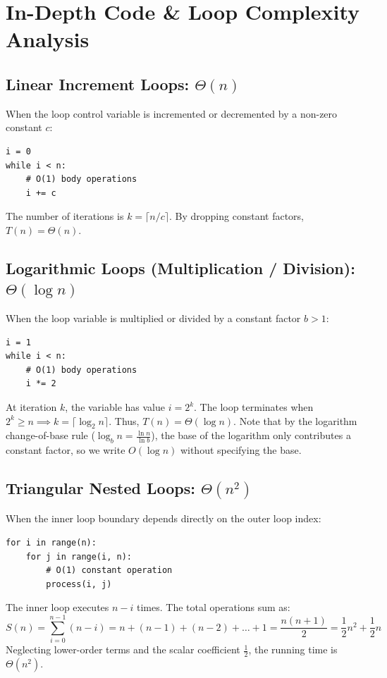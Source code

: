 \documentclass[11pt,a4paper]{article}
\begin{document}
\newpage
\section{In-Depth Code \& Loop Complexity Analysis}

\subsection{Linear Increment Loops: $\Theta(n)$}
When the loop control variable is incremented or decremented by a non-zero constant $c$:
\begin{lstlisting}[style=pythonstyle]
i = 0
while i < n:
    # O(1) body operations
    i += c
\end{lstlisting}
The number of iterations is $k = \lceil n / c \rceil$. By dropping constant factors, $T(n) = \Theta(n)$.

\subsection{Logarithmic Loops (Multiplication / Division): $\Theta(\log n)$}
When the loop variable is multiplied or divided by a constant factor $b > 1$:
\begin{lstlisting}[style=pythonstyle]
i = 1
while i < n:
    # O(1) body operations
    i *= 2
\end{lstlisting}
At iteration $k$, the variable has value $i = 2^k$. The loop terminates when $2^k \ge n \implies k = \lceil \log_2 n \rceil$. Thus, $T(n) = \Theta(\log n)$. Note that by the logarithm change-of-base rule ($\log_b n = \frac{\ln n}{\ln b}$), the base of the logarithm only contributes a constant factor, so we write $O(\log n)$ without specifying the base.

\subsection{Triangular Nested Loops: $\Theta(n^2)$}
When the inner loop boundary depends directly on the outer loop index:
\begin{lstlisting}[style=pythonstyle]
for i in range(n):
    for j in range(i, n):
        # O(1) constant operation
        process(i, j)
\end{lstlisting}
The inner loop executes $n - i$ times. The total operations sum as:
\[
S(n) = \sum_{i=0}^{n-1} (n - i) = n + (n-1) + (n-2) + \dots + 1 = \frac{n(n+1)}{2} = \frac{1}{2}n^2 + \frac{1}{2}n
\]
Neglecting lower-order terms and the scalar coefficient $\frac{1}{2}$, the running time is $\Theta(n^2)$.
\end{document}
